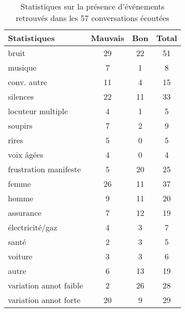 \begin{table}[h]
    \centering
    \begin{tabular}{|p{6cm}|c c c|}
         \hline
         Statistiques &Mauvais &Bon &Total \\
         \hline
         bruit &29 &22 &51 \\
         musique &7 &1 &8 \\
         conv. autre &11 &4 &15 \\
         silences &22 &11 &33 \\
         locuteur multiple &4 &1 &5 \\
         soupirs &7 &2 &9 \\
         rires &5 &0 &5 \\
         voix âgées &4 &0 &4 \\
         frustration manifeste &5 &20 &25 \\
         \hline
         femme &26 &11 &37 \\
         homme &9 &11 &20 \\
         \hline
         assurance &7 &12 &19 \\
         électricité/gaz &4 &3 &7 \\
         santé &2 &3 &5 \\
         voiture &3 &3 &6 \\
         autre &6 &13 &19 \\
         \hline
         variation annot faible &2 &26 &28 \\
         variation annot forte &20 &9 &29 \\
         \hline
    \end{tabular}
    \caption{Statistiques sur la présence d'événements retrouvés dans les 57 conversations écoutées}
    \label{tab:ecouteHumaine}
\end{table}

